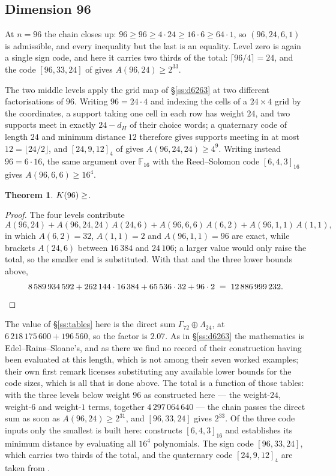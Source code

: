 \documentclass[11pt]{amsart}
\newtheorem{theorem}{Theorem}[section]
\theoremstyle{remark}
\newcommand{\Leech}{\Lambda_{24}}
\newcommand{\Gsz}{\Gamma_{72}}
\begin{document}
\subsection{Dimension 96}\label{ss:d96}

At $n=96$ the chain closes up: $96\ge96\ge4\cdot24\ge16\cdot6\ge64\cdot1$, so
$(96,24,6,1)$ is admissible, and every inequality but the last is an equality.
Level zero is again a single sign code, and here it carries two thirds of the
total: $\lceil96/4\rceil=24$, and the code $[96,33,24]$ of \cite{codetables}
gives $A(96,24)\ge2^{33}$.

The two middle levels apply the grid map of \S\ref{ss:d6263} at two different
factorisations of $96$. Writing $96=24\cdot4$ and indexing the cells of a
$24\times4$ grid by the coordinates, a support taking one cell in each row has
weight $24$, and two supports meet in exactly $24-d_H$ of their choice words; a
quaternary code of length $24$ and minimum distance $12$ therefore gives supports
meeting in at most $12=\lfloor24/2\rfloor$, and $[24,9,12]_4$ of \cite{codetables} gives
$A(96,24,24)\ge4^9$. Writing instead $96=6\cdot16$, the same argument over
$\mathbb F_{16}$ with the Reed--Solomon code $[6,4,3]_{16}$ gives
$A(96,6,6)\ge16^4$.

\begin{theorem}\label{thm:96}
$K(96)\ge\Kh{96}$.
\end{theorem}

\begin{proof}
The four levels contribute
\[
  A(96,24)+A(96,24,24)\,A(24,6)+A(96,6,6)\,A(6,2)+A(96,1,1)\,A(1,1),
\]
in which $A(6,2)=32$, $A(1,1)=2$ and $A(96,1,1)=96$ are exact, while \cite{brouwer}
brackets $A(24,6)$ between $16\,384$ and $24\,106$; a larger value would only raise
the total, so the smaller end is substituted. With that and the three lower bounds
above,
\[
  8\,589\,934\,592+262\,144\cdot16\,384+65\,536\cdot32+96\cdot2
  \;=\;12\,886\,999\,232 . \qedhere
\]
\end{proof}

The value of \S\ref{ss:tables} here is the direct sum $\Gsz\oplus\Leech$, at
$6\,218\,175\,600+196\,560$, so the factor is $2.07$. As in \S\ref{ss:d6263} the
mathematics is Edel--Rains--Sloane's, and as there we find no record of their
construction having been evaluated at this length, which is not among their seven
worked examples; their own first
remark licenses substituting any available lower bounds for the code sizes, which
is all that is done above. The total is a function of those tables: with the three
levels below weight $96$ as constructed here --- the weight-$24$, weight-$6$ and
weight-$1$ terms, together $4\,297\,064\,640$ --- the chain passes the direct sum
as soon as $A(96,24)\ge2^{31}$, and $[96,33,24]$ gives $2^{33}$. Of the three code inputs only the smallest is
built here: \cite{repo} constructs $[6,4,3]_{16}$ and establishes its minimum distance
by evaluating all $16^4$ polynomials. The sign code $[96,33,24]$, which carries two
thirds of the total, and the quaternary code $[24,9,12]_4$ are taken from \cite{codetables}.
\end{document}
